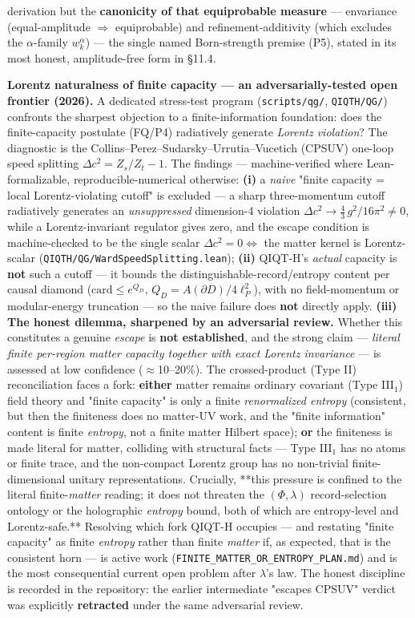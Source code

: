 \documentclass[11pt,a4paper]{article}
\begin{document}
derivation but the \textbf{canonicity of that equiprobable measure} — envariance (equal-amplitude $\Rightarrow$ equiprobable) and refinement-additivity (which excludes the $\alpha$-family $w_k^{\alpha}$) — the single named Born-strength premise (P5), stated in its most honest, amplitude-free form in §11.4.

\textbf{Lorentz naturalness of finite capacity — an adversarially-tested open frontier (2026).} A dedicated stress-test program (\texttt{scripts/qg/}, \texttt{QIQTH/QG/}) confronts the sharpest objection to a finite-information foundation: does the finite-capacity postulate (FQ/P4) radiatively generate \emph{Lorentz violation}? The diagnostic is the Collins–Perez–Sudarsky–Urrutia–Vucetich (CPSUV) one-loop speed splitting $\Delta c^2 = Z_s/Z_t - 1$. The findings — machine-verified where Lean-formalizable, reproducible-numerical otherwise: \textbf{(i)} a \emph{naive} "finite capacity = local Lorentz-violating cutoff" is excluded — a sharp three-momentum cutoff radiatively generates an \emph{unsuppressed} dimension-4 violation $\Delta c^2 \to \tfrac43\,g^2/16\pi^2 \neq 0$, while a Lorentz-invariant regulator gives zero, and the escape condition is machine-checked to be the single scalar $\Delta c^2 = 0 \Leftrightarrow$ the matter kernel is Lorentz-scalar (\texttt{QIQTH/QG/WardSpeedSplitting.lean}); \textbf{(ii)} QIQT-H's \emph{actual} capacity is \textbf{not} such a cutoff — it bounds the distinguishable-record/entropy content per causal diamond ($\mathrm{card}\le e^{Q_D}$, $Q_D=A(\partial D)/4\ell_P^2$), with no field-momentum or modular-energy truncation — so the naive failure does \textbf{not} directly apply. \textbf{(iii) The honest dilemma, sharpened by an adversarial review.} Whether this constitutes a genuine \emph{escape} is \textbf{not established}, and the strong claim — \emph{literal finite per-region matter capacity together with exact Lorentz invariance} — is assessed at low confidence ($\approx$10–20\%). The crossed-product (Type II) reconciliation faces a fork: \textbf{either} matter remains ordinary covariant (Type III$_1$) field theory and "finite capacity" is only a finite \emph{renormalized entropy} (consistent, but then the finiteness does no matter-UV work, and the "finite information" content is finite \emph{entropy}, not a finite matter Hilbert space); \textbf{or} the finiteness is made literal for matter, colliding with structural facts — Type III$_1$ has no atoms or finite trace, and the non-compact Lorentz group has no non-trivial finite-dimensional unitary representations. Crucially, **this pressure is confined to the literal finite-\emph{matter} reading; it does not threaten the $(\Phi,\lambda)$ record-selection ontology or the holographic \emph{entropy} bound, both of which are entropy-level and Lorentz-safe.** Resolving which fork QIQT-H occupies — and restating "finite capacity" as finite \emph{entropy} rather than finite \emph{matter} if, as expected, that is the consistent horn — is active work (\texttt{FINITE\_MATTER\_OR\_ENTROPY\_PLAN.md}) and is the most consequential current open problem after $\lambda$'s law. The honest discipline is recorded in the repository: the earlier intermediate "escapes CPSUV" verdict was explicitly \textbf{retracted} under the same adversarial review.
\end{document}
